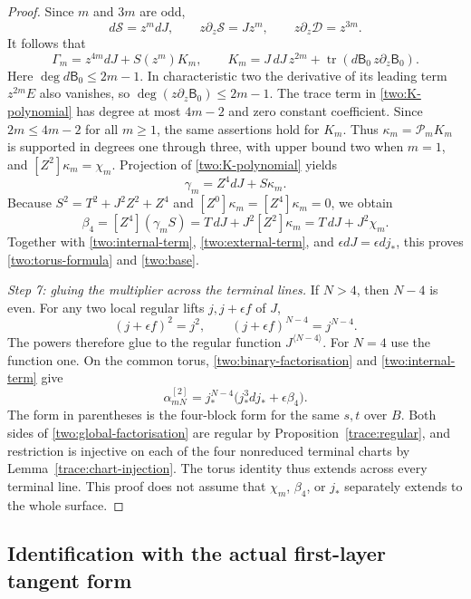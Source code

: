 \begin{proof}
Since $m$ and $3m$ are odd,
\[
 d\mathcal S=z^m dJ,\qquad z\partial_z\mathcal S=Jz^m,
 \qquad z\partial_z\mathcal D=z^{3m}.
\]
It follows that
\begin{equation}
 \Gamma_m=z^{4m}dJ+S(z^m)K_m,\qquad
 K_m=J\,dJ\,z^{2m}
        +\operatorname{tr}(d\mathsf B_0\,z\partial_z\mathsf B_0).
 \label{two:K-polynomial}
\end{equation}
Here $\deg d\mathsf B_0\le2m-1$. In characteristic two the
derivative of its leading term $z^{2m}E$ also vanishes, so
$\deg(z\partial_z\mathsf B_0)\le2m-1$. The trace term in
\eqref{two:K-polynomial} has degree at most $4m-2$ and zero
constant coefficient. Since $2m\le4m-2$ for all $m\ge1$,
the same assertions hold for $K_m$. Thus
$\kappa_m=\mathcal P_mK_m$ is supported in degrees one
through three, with upper bound two when $m=1$, and
$[Z^2]\kappa_m=\chi_m$. Projection of
\eqref{two:K-polynomial} yields
\[
 \gamma_m=Z^4dJ+S\kappa_m.
\]
Because $S^2=T^2+J^2Z^2+Z^4$ and
$[Z^0]\kappa_m=[Z^4]\kappa_m=0$, we obtain
\[
 \beta_4=[Z^4](\gamma_m S)
         =T\,dJ+J^2[Z^2]\kappa_m
         =T\,dJ+J^2\chi_m.
\]
Together with \eqref{two:internal-term},
\eqref{two:external-term}, and $\epsilon dJ=\epsilon dj_*$,
this proves \eqref{two:torus-formula} and \eqref{two:base}.

\emph{Step 7: gluing the multiplier across the terminal lines.}
If $N>4$, then $N-4$ is even. For any two local regular
lifts $j,j+\epsilon f$ of $J$,
\[
 (j+\epsilon f)^2=j^2,
 \qquad (j+\epsilon f)^{N-4}=j^{N-4}.
\]
The powers therefore glue to the regular function
$J^{\langle N-4\rangle}$. For $N=4$ use the function one.
On the common torus, \eqref{two:binary-factorisation} and
\eqref{two:internal-term} give
\[
 \alpha_{mN}^{[2]}
 =j_*^{N-4}\bigl(j_*^3dj_*+\epsilon\beta_4\bigr).
\]
The form in parentheses is the four-block form for the same
$s,t$ over $B$. Both sides of \eqref{two:global-factorisation}
are regular by Proposition~\ref{trace:regular}, and restriction
is injective on each of the four nonreduced terminal charts by
Lemma~\ref{trace:chart-injection}. The torus identity thus
extends across every terminal line. This proof does not assume
that $\chi_m$, $\beta_4$, or $j_*$ separately extends to the
whole surface.
\end{proof}

\subsection{Identification with the actual first-layer tangent form}

